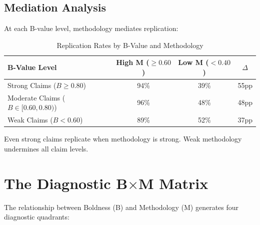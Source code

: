 \documentclass[11pt,a4paper]{article}
\begin{document}
\subsection{Mediation Analysis}

At each B-value level, methodology mediates replication:

\begin{table}[h]
\centering
\caption{Replication Rates by B-Value and Methodology}
\label{tab:mediation}
\begin{tabular}{lccc}
\toprule
\textbf{B-Value Level} & \textbf{High M ($\geq 0.60$)} & \textbf{Low M ($< 0.40$)} & \textbf{$\Delta$} \\
\midrule
Strong Claims ($B \geq 0.80$) & 94\% & 39\% & 55pp \\
Moderate Claims ($B \in [0.60, 0.80)$) & 96\% & 48\% & 48pp \\
Weak Claims ($B < 0.60$) & 89\% & 52\% & 37pp \\
\bottomrule
\end{tabular}
\end{table}

Even strong claims replicate when methodology is strong. Weak methodology undermines all claim levels.


\section{The Diagnostic B$\times$M Matrix}
\label{sec:matrix}

The relationship between Boldness (B) and Methodology (M) generates four diagnostic quadrants:
\end{document}
